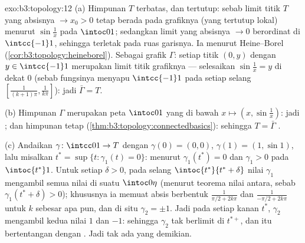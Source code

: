 \begin{solution}{exo:b3:topology:12}
(a) Himpunan $T$ terbatas, dan tertutup: sebab limit titik $T$
yang absisnya $\to x_0 > 0$ tetap berada pada grafiknya (yang tertutup
lokal) menurut  $\sin\frac1x$ pada $\intoc01$; sedangkan limit
yang absisnya $\to 0$ berordinat di $\intcc{-1}1$, sehingga
terletak pada ruas garisnya. Ia  menurut Heine--Borel
(\cref{cor:b3:topology:heineborel}). Sebagai  grafik
$\Gamma$: setiap titik $(0, y)$ dengan $y \in \intcc{-1}1$ merupakan
limit titik grafiknya --- selesaikan $\sin\frac1x = y$ di dekat $0$
(sebab fungsinya menyapu $\intcc{-1}1$ pada setiap selang
$[\frac1{(k+1)\pi}, \frac1{k\pi}]$): jadi $\bar\Gamma = T$.

(b) Himpunan $\Gamma$ merupakan peta  $\intoc01$ yang
 di bawah $x \mapsto (x, \sin\frac1x)$: jadi ;
dan  himpunan  tetap 
(\cref{thm:b3:topology:connectedbasics}): sehingga $T = \bar\Gamma$
.

(c) Andaikan $\gamma\colon\intcc01\to T$  dengan
$\gamma(0) = (0,0)$, $\gamma(1) = (1, \sin1)$, lalu misalkan $t^*
= \sup\{t : \gamma_1(t) = 0\}$: menurut  $\gamma_1(t^*)
= 0$ dan $\gamma_1 > 0$ pada $\intoc{t^*}1$. Untuk setiap
$\delta > 0$, pada selang $\intoc{t^*}{t^*+\delta}$ nilai
$\gamma_1$ mengambil semua nilai di suatu $\intoc0\eta$
(menurut teorema nilai antara, sebab $\gamma_1(t^* + \delta) > 0$);
khususnya ia memuat absis berbentuk
$\frac1{\pi/2 + 2k\pi}$ dan $\frac1{-\pi/2 + 2k\pi}$ untuk
$k$ sebesar apa pun, dan di situ $\gamma_2 = \pm1$. Jadi pada
setiap  kanan $t^*$, $\gamma_2$ mengambil kedua
nilai $1$ dan $-1$: sehingga $\gamma_2$ tak berlimit di $t^{*+}$,
dan itu bertentangan dengan . Jadi tak ada  yang demikian.


\end{solution}
